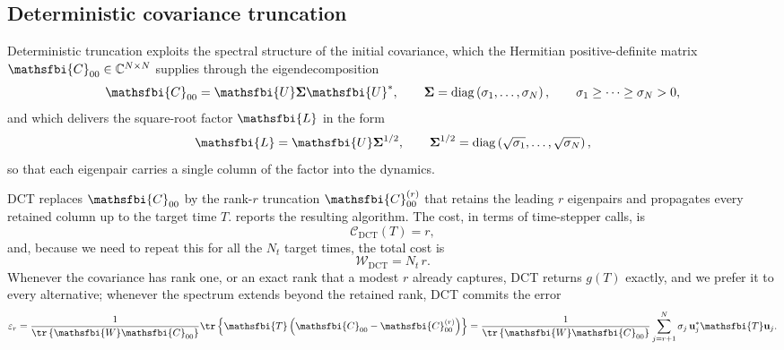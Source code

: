 \subsection{Deterministic covariance truncation}
\label{sec:appendix_deterministic_truncation}
\label{sec:appendix_necessity_sste}

Deterministic truncation exploits the spectral structure of the initial covariance, which the
Hermitian positive-definite matrix \(\mathsfbi{C}_{00}\in\mathbb{C}^{N\times N}\) supplies through
the eigendecomposition
\begin{equation}
  \mathsfbi{C}_{00}
  =
  \mathsfbi{U}\boldsymbol{\Sigma}\mathsfbi{U}^{*},
  \qquad
  \boldsymbol{\Sigma}
  =
  \operatorname{diag}
  \left(
    \sigma_1,\dots,\sigma_N
  \right),
  \qquad
  \sigma_1\geq\dots\geq\sigma_N>0,
  \label{eq:C00_eigendecomposition_sste_necessity}
\end{equation}
and which delivers the square-root factor \(\mathsfbi{L}\) in the form
\begin{equation}
  \mathsfbi{L}
  =
  \mathsfbi{U}\boldsymbol{\Sigma}^{1/2},
  \qquad
  \boldsymbol{\Sigma}^{1/2}
  =
  \operatorname{diag}
  \left(
    \sqrt{\sigma_1},\dots,\sqrt{\sigma_N}
  \right),
  \label{eq:C00_square_root_factor_sste_necessity}
\end{equation}
so that each eigenpair carries a single column of the factor into the dynamics.

DCT replaces \(\mathsfbi{C}_{00}\) by the rank-\(r\) truncation \(\mathsfbi{C}_{00}^{(r)}\) that
retains the leading \(r\) eigenpairs and propagates every retained column up to the target time
\(T\).  reports the resulting algorithm. The cost, in terms of
time-stepper calls, is
\begin{equation}
  \mathcal{C}_{\mathrm{DCT}}(T)=r,
  \label{eq:deterministic_fixed_time_cost}
\end{equation}
and, because we need to repeat this for all the \(N_t\) target times, the total cost is
\begin{equation}
  \mathcal{W}_{\mathrm{DCT}}=N_t\,r.
  \label{eq:deterministic_history_cost}
\end{equation}
Whenever the covariance has rank one, or an exact rank that a modest \(r\) already captures, DCT
returns \(g(T)\) exactly, and we prefer it to every alternative; whenever the spectrum extends
beyond the retained rank, DCT commits the error
\begin{equation}
  \varepsilon_r
  =
  \frac{1}{\tr\left\{\mathsfbi{W}\mathsfbi{C}_{00}\right\}}
  \tr
  \left\{
    \mathsfbi{T}
    \left(
      \mathsfbi{C}_{00}
      -
      \mathsfbi{C}_{00}^{(r)}
    \right)
  \right\}
  =
  \frac{1}{\tr\left\{\mathsfbi{W}\mathsfbi{C}_{00}\right\}}
  \sum_{j=r+1}^{N}
  \sigma_j\,
  \mathbf{u}_j^{*}\mathsfbi{T}\mathbf{u}_j.
  \label{eq:trace_error_1}
\end{equation}


